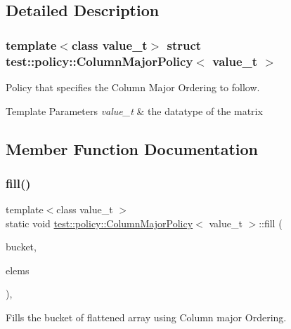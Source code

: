 \subsection{Detailed Description}
\subsubsection*{template$<$class value\+\_\+t$>$\newline
struct test\+::policy\+::\+Column\+Major\+Policy$<$ value\+\_\+t $>$}

Policy that specifies the Column Major Ordering to follow. 


\begin{DoxyTemplParams}{Template Parameters}
{\em value\+\_\+t} & the datatype of the matrix \\
\hline
\end{DoxyTemplParams}


\subsection{Member Function Documentation}
\mbox{\label{structtest_1_1policy_1_1ColumnMajorPolicy_afd5927c90a00e01ab205acf03eae64d2}} 
\subsubsection{\texorpdfstring{fill()}{fill()}}
{\footnotesize\ttfamily template$<$class value\+\_\+t $>$ \\
static void \mbox{\hyperlink{structtest_1_1policy_1_1ColumnMajorPolicy}{test\+::policy\+::\+Column\+Major\+Policy}}$<$ value\+\_\+t $>$\+::fill (\begin{DoxyParamCaption}\item[{std\+::vector$<$ value\+\_\+t $>$ \&}]{bucket,  }\item[{std\+::vector$<$ std\+::vector$<$ value\+\_\+t $>$$>$ const \&}]{elems }\end{DoxyParamCaption})\hspace{0.3cm}{\ttfamily [inline]}, {\ttfamily [static]}}



Fills the bucket of flattened array using Column major Ordering. 


